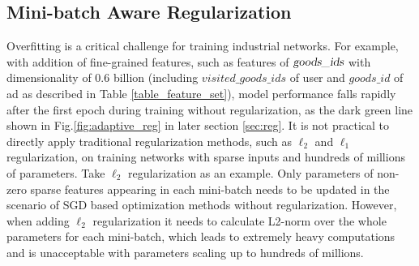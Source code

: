 \subsection{Mini-batch Aware Regularization}


Overfitting is a critical challenge for training industrial networks. 
For example, with addition of fine-grained features, such as features of $\textsl{goods\_ids}$ with dimensionality of 0.6 billion (including $visited\_goods\_ids$ of user and $goods\_id$ of ad as described in Table \ref{table_feature_set}), model performance falls rapidly after the first epoch during training without regularization, as the dark green line shown in Fig.\ref{fig:adaptive_reg} in later section \ref{sec:reg}.   
It is not practical to directly apply traditional regularization methods, such as $\ell_2$ and $\ell_1$ regularization, on training networks with sparse inputs and hundreds of millions of parameters.
Take $\ell_2$ regularization as an example.
Only parameters of non-zero sparse features appearing in each mini-batch needs to be updated in the scenario of SGD based optimization methods without regularization. 
However, when adding $\ell_2$ regularization it needs to calculate L2-norm over the whole parameters for each mini-batch, which leads to extremely heavy computations and is unacceptable with parameters scaling up to hundreds of millions.        

